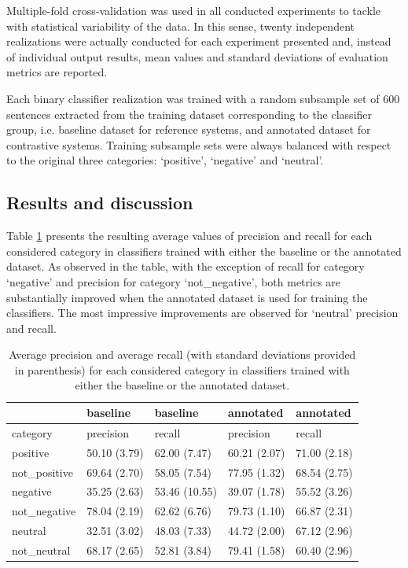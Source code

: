 \documentclass[11pt,letterpaper]{article}
\begin{document}
Multiple-fold cross-validation was used in all conducted experiments to tackle with statistical variability of the 
data. In this sense, twenty independent realizations were actually conducted for each experiment presented and,
instead of individual output results, mean values and standard deviations of evaluation metrics are reported.

Each binary classifier realization was trained with a random subsample set of 600 sentences extracted from 
the training dataset corresponding to the classifier group, i.e. baseline dataset for reference systems, 
and annotated dataset for contrastive systems. Training subsample sets were always balanced with respect to 
the original three categories: `positive', `negative' and `neutral'.

\subsection{Results and discussion}
Table \ref{tc_pre_rec} presents the resulting average values of precision and recall for each considered category 
in classifiers trained with either the baseline or the annotated dataset. As observed in the table, with the
exception of recall for category `negative' and precision for category `not\_negative', both metrics are substantially 
improved when the annotated dataset is used for training the classifiers. The most impressive improvements
are observed for `neutral' precision and recall. 

\begin{table}
\begin{tabular}{|l|l|l|l|l|}
\hline
&baseline &baseline &annotated &annotated \\ 
\hline
category &precision &recall &precision &recall \\ 
\hline
positive &50.10 (3.79) &62.00 (7.47) &60.21 (2.07) &71.00 (2.18) \\ 
\hline
not\_positive &69.64 (2.70) &58.05 (7.54) &77.95 (1.32) &68.54 (2.75) \\ 
\hline
negative &35.25 (2.63) &53.46 (10.55) &39.07 (1.78) &55.52 (3.26) \\ 
\hline
not\_negative &78.04 (2.19) &62.62 (6.76) &79.73 (1.10) &66.87 (2.31) \\ 
\hline
neutral &32.51 (3.02) &48.03 (7.33) &44.72 (2.00) &67.12 (2.96) \\ 
\hline
not\_neutral &68.17 (2.65) &52.81 (3.84) &79.41 (1.58) &60.40 (2.96) \\ 
\hline
\end{tabular}
\caption{Average precision and average recall (with standard deviations provided in parenthesis) 
for each considered category in classifiers trained with either the baseline or the annotated dataset.}
\label{tc_pre_rec}
\end{table}
\end{document}
